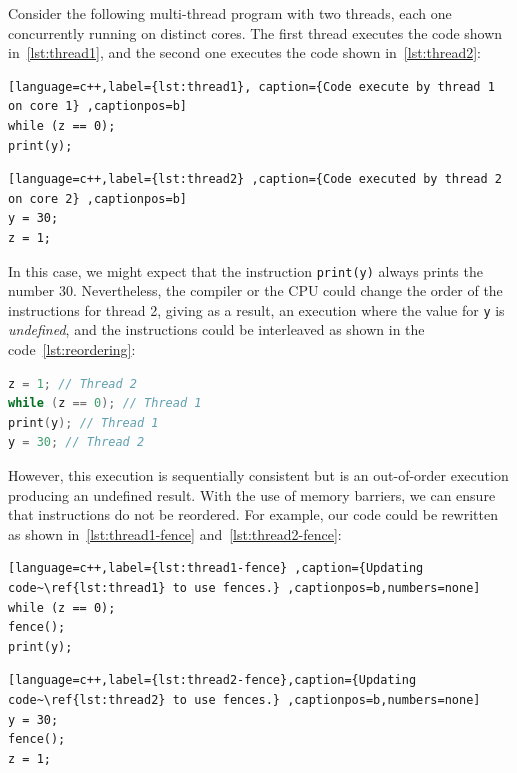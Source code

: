 \begin{example}
\label{ex:reordering}
Consider the following multi-thread program with two threads, each one concurrently running on distinct cores. The first thread executes the code shown in~\ref{lst:thread1}, and the second one executes the code shown in~\ref{lst:thread2}:

\begin{lstlisting}[language=c++,label={lst:thread1}, caption={Code execute by thread 1 on core 1} ,captionpos=b]
while (z == 0);
print(y);
\end{lstlisting}

\begin{lstlisting}[language=c++,label={lst:thread2} ,caption={Code executed by thread 2 on core 2} ,captionpos=b]
y = 30;
z = 1;
\end{lstlisting}


In this case, we might expect that the instruction \texttt{print(y)} always prints the number 30. Nevertheless, the compiler or the CPU could change the order of the instructions for thread 2, giving as a result, an execution where the value for \texttt{y} is \emph{undefined}, and the instructions could be interleaved as shown in the code~\ref{lst:reordering}:

\begin{lstlisting}[language=c++,label={lst:reordering},caption={Code reordered by CPU}, captionpos=b]
z = 1; // Thread 2
while (z == 0); // Thread 1
print(y); // Thread 1
y = 30; // Thread 2
\end{lstlisting}

However, this execution is sequentially consistent but is an out-of-order execution producing an undefined result. With the use of memory barriers, we can ensure that instructions do not be reordered. For example, our code could be rewritten as shown in~\ref{lst:thread1-fence} and~\ref{lst:thread2-fence}:

\begin{lstlisting}[language=c++,label={lst:thread1-fence} ,caption={Updating code~\ref{lst:thread1} to use fences.} ,captionpos=b,numbers=none]
while (z == 0);
fence();
print(y);
\end{lstlisting}

\begin{lstlisting}[language=c++,label={lst:thread2-fence},caption={Updating code~\ref{lst:thread2} to use fences.} ,captionpos=b,numbers=none]
y = 30;
fence();
z = 1;
\end{lstlisting}

\end{example}

